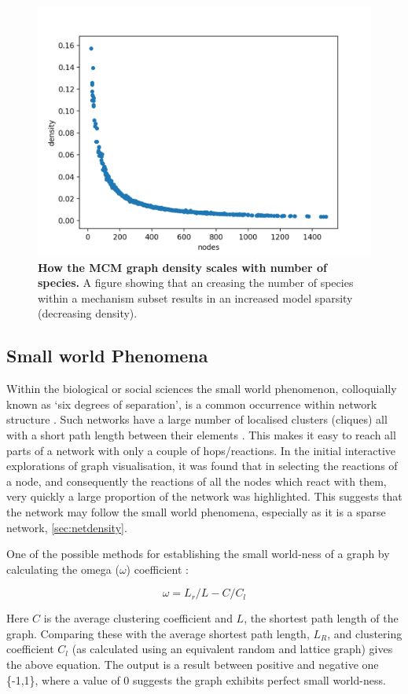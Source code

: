 \begin{figure}[H]
     \centering
         \includegraphics[width=.7\textwidth]{figures_c3/sparcity.png}
        \caption{\textbf{How the MCM graph density scales with number of species.} A figure showing that an creasing the number of species within a mechanism subset results in an increased model sparsity (decreasing density).}
        \label{fig:density}
\end{figure}

\subsection{Small world Phenomena}
Within the biological or social sciences the small world phenomenon, colloquially known as `six degrees of separation', is a common occurrence within network structure \citep{smallworld}. Such networks have a large number of localised clusters (cliques) all with a short path length between their elements \citep{sm2}. This makes it easy to reach all parts of a network with only a couple of hops/reactions. In the initial interactive explorations of graph visualisation, it was found that in selecting the reactions of a node, and consequently the reactions of all the nodes which react with them, very quickly a large proportion of the network was highlighted. This suggests that the network may follow the small world phenomena, especially as it is a sparse network, \autoref{sec:netdensity}.

One of the possible methods for establishing the small world-ness of a graph by calculating the omega ($\omega$) coefficient \citep{networkx}:

\begin{equation}
\omega = L_r/L - C/C_l
\end{equation}

Here $C$ is the average clustering coefficient and $L$, the shortest path length of the graph. Comparing these with the average shortest path length, $L_R$, and clustering coefficient $C_l$ (as calculated using an equivalent random and lattice graph) gives the above equation. The output is a result between positive and negative one \{-1,1\}, where a value of 0 suggests the graph exhibits perfect small world-ness.

